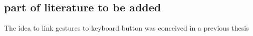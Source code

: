 %
%
%
%
%
%
%
%
%
%
%
%

\textsc{}
\subsection{part of literature to be added}
The idea to link gestures to keyboard button was conceived in a previous thesis \cite{Verbouw2016}